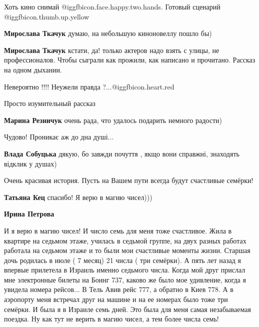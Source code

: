 \begin{itemize}
Хоть кино снимай @igg{fbicon.face.happy.two.hands}. Готовый сценарий  @igg{fbicon.thumb.up.yellow} 

\begin{itemize} %
\textbf{Мирослава Ткачук} думаю, на небольшую киноновеллу пошло бы)

\textbf{Мирослава Ткачук} кстати, да! только актеров надо взять с улицы, не профессионалов. Чтобы сыграли как прожили, как написано и прочитано. Рассказ на одном дыхании.
\end{itemize} %

Невероятно !!!! Неужели правда ?...@igg{fbicon.heart.red}

Просто изумительный рассказ

\begin{itemize} %
\textbf{Марина Резничук} очень рада, что удалось подарить немного радости)
\end{itemize} %

Чудово! Проникає аж до дна душі...

\begin{itemize} %
\textbf{Влада Собуцька} дякую, бо завжди почуття , якщо вони справжні, знаходять відклик у душах)
\end{itemize} %

Очень красивая история. Пусть на Вашем пути всегда будут счастливые семёрки!

\begin{itemize} %
\textbf{Татьяна Кец} спасибо! Я верю в магию чисел)))

\textbf{Ирина Петрова} 

И я верю в магию чисел! И число семь для меня тоже счастливое. Жила в квартире
на седьмом этаже, училась в седьмой группе, на двух разных работах работала на
седьмом этаже и то были мои счастливые моменты жизни. Старшая дочь родилась в
июле ( 7 месяц) 21 числа ( три семёрки). А пять лет назад я впервые прилетела в
Израиль именно седьмого числа. Когда мой друг прислал мне электронные билеты на
Боинг 737, каково же было мое удивление, когда я увидела номера рейсов... В
Тель Авив рейс 777, а обратно в Киев 778. А в аэропорту меня встречал друг на
машине и на ее номерах было тоже три семёрки. И была я в Израиле семь дней. Это
была для меня самая незабываемая поездка. Ну как тут не верить в магию чисел, а
тем более числа семь!


\end{itemize}
\end{itemize}
